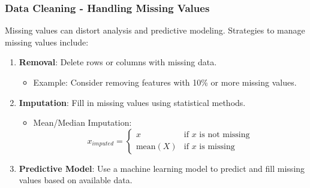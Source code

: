 \documentclass[aspectratio=169]{beamer}
\begin{document}
\begin{frame}[fragile]
    \frametitle{Data Cleaning - Handling Missing Values}
    Missing values can distort analysis and predictive modeling. Strategies to manage missing values include:
    \begin{enumerate}
        \item \textbf{Removal}: Delete rows or columns with missing data.
              \begin{itemize}
                  \item Example: Consider removing features with 10\% or more missing values.
              \end{itemize}
        \item \textbf{Imputation}: Fill in missing values using statistical methods.
              \begin{itemize}
                  \item Mean/Median Imputation: 
                  \begin{equation}
                  x_{imputed} =  \begin{cases}
                  x & \text{if } x \text{ is not missing} \\
                  \text{mean}(X) & \text{if } x \text{ is missing}
                  \end{cases}
                  \end{equation}
              \end{itemize}
        \item \textbf{Predictive Model}: Use a machine learning model to predict and fill missing values based on available data.
    \end{enumerate}
\end{frame}
\end{document}
